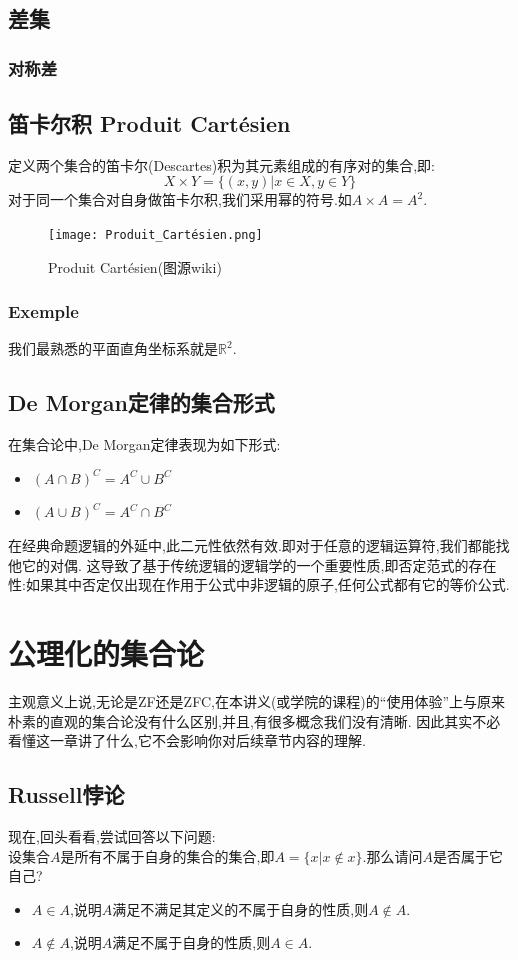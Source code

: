 \documentclass[12pt, a4paper, oneside]{ctexbook}
\begin{document}
  \subsection{差集}
  \subsubsection{对称差}

  \subsection{笛卡尔积 Produit Cartésien}
  定义两个集合的笛卡尔(Descartes)积为其元素组成的有序对的集合,即:
  $$
  X\times Y=\{(x,y)|x\in X,y\in Y\}
  $$对于同一个集合对自身做笛卡尔积,我们采用幂的符号.如$A\times A=A^2$.

  \begin{figure}[H]
    \centering
    \texttt{[image: Produit\_Cartésien.png]}
    \caption{Produit Cartésien(图源wiki)}
    \label{myref:Produit_Cartésien}
  \end{figure}
  \subsubsection{Exemple}
  我们最熟悉的平面直角坐标系就是$\mathbb{R}^2$.
  \subsection{De Morgan定律的集合形式}
  在集合论中,De Morgan定律表现为如下形式:
  \begin{itemize}
    \item $(A\cap B)^C=A^C\cup B^C $
    \item $(A\cup B)^C=A^C\cap B^C $
  \end{itemize}


  在经典命题逻辑的外延中,此二元性依然有效.即对于任意的逻辑运算符,我们都能找他它的对偶.
  这导致了基于传统逻辑的逻辑学的一个重要性质,即否定范式的存在性:如果其中否定仅出现在作用于公式中非逻辑的原子,任何公式都有它的等价公式.

  \section{公理化的集合论}\label{myref:公理化}
  主观意义上说,无论是ZF还是ZFC,在本讲义(或学院的课程)的“使用体验”上与原来朴素的直观的集合论没有什么区别,并且,有很多概念我们没有清晰.
  因此其实不必看懂这一章讲了什么,它不会影响你对后续章节内容的理解.
  \subsection{Russell悖论}
  现在,回头看看,尝试回答以下问题:\\
  设集合$A$是所有不属于自身的集合的集合,即$A=\{x | x\notin x\}$.那么请问$A$是否属于它自己?
  \begin{itemize}
    \item $A\in A$,说明$A$满足不满足其定义的不属于自身的性质,则$A\notin A$.
    \item $A\notin A$,说明$A$满足不属于自身的性质,则$A\in A$.
  \end{itemize}
\end{document}
